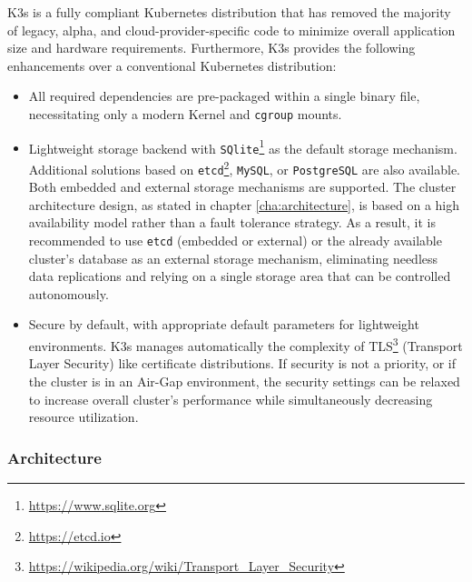 K3s is a fully compliant Kubernetes distribution that has removed the majority
of legacy, alpha, and cloud-provider-specific code to minimize overall
application size and hardware requirements. Furthermore, K3s provides the
following enhancements over a conventional Kubernetes distribution\cite{k3s_enhancements}:
\begin{itemize}
  \item All required dependencies are pre-packaged within a single binary file,
    necessitating only a modern Kernel and \texttt{cgroup} mounts.

  \item Lightweight storage backend with \texttt{SQlite}\footnote{\url{https://www.sqlite.org}}
    as the default storage mechanism. Additional solutions based on \texttt{etcd}\footnote{\url{https://etcd.io}},
    \texttt{MySQL}, or \texttt{PostgreSQL} are also available. Both embedded and
    external storage mechanisms are supported.
    \newline
    The cluster architecture design, as stated in chapter \ref{cha:architecture},
    is based on a high availability model rather than a fault tolerance strategy.
    As a result, it is recommended to use \texttt{etcd} (embedded or external) or
    the already available cluster's database as an external storage mechanism,
    eliminating needless data replications and relying on a single storage area
    that can be controlled autonomously.

  \item Secure by default, with appropriate default parameters for lightweight
    environments. K3s manages automatically the complexity of TLS\footnote{\url{https://wikipedia.org/wiki/Transport_Layer_Security}}
    (Transport Layer Security) like certificate distributions.
    \newline
    If security is not a priority, or if the cluster is in an Air-Gap environment,
    the security settings can be relaxed to increase overall cluster's
    performance while simultaneously decreasing resource utilization.
\end{itemize}

\subsubsection{Architecture}
\label{subsubsec:implementation_dependencies_k3s_architecture}

